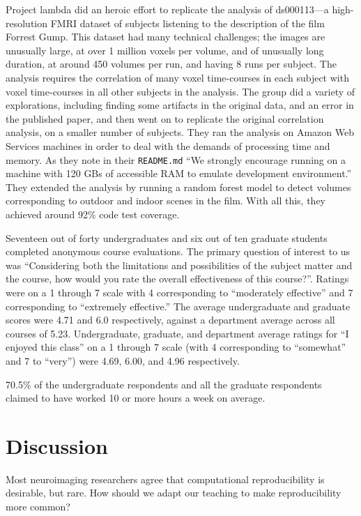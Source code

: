 Project lambda did an heroic effort to replicate the analysis of ds000113---a
high-resolution FMRI dataset of subjects listening to the description of the
film Forrest Gump.  This dataset had many technical challenges; the images are
unusually large, at over 1 million voxels per volume, and of unusually long
duration, at around 450 volumes per run, and having 8 runs per subject.  The
analysis requires the correlation of many voxel time-courses in each subject
with voxel time-courses in all other subjects in the analysis.  The group did
a variety of explorations, including finding some artifacts in the original
data, and an error in the published paper, and then went on to replicate the
original correlation analysis, on a smaller number of subjects.  They ran the
analysis on Amazon Web Services machines in order to deal with the demands of
processing time and memory.  As they note in their \texttt{README.md} ``We
strongly encourage running on a machine with 120 GBs of accessible RAM to
emulate development environment.'' They extended the analysis by running a
random forest model to detect volumes corresponding to outdoor and indoor
scenes in the film.  With all this, they achieved around 92\% code test
coverage.

Seventeen out of forty undergraduates and six out of ten graduate students
completed anonymous course evaluations.  The primary question of interest to
us was ``Considering both the limitations and possibilities of the subject
matter and the course, how would you rate the overall effectiveness of this
course?''.  Ratings were on a 1 through 7 scale with 4 corresponding to
``moderately effective'' and 7 corresponding to ``extremely effective.''
The average undergraduate and graduate scores were
4.71 and 6.0 respectively, against a department average across all courses of
5.23.  Undergraduate, graduate, and department average ratings for ``I enjoyed
this class'' on a 1 through 7 scale (with 4 corresponding to
``somewhat'' and 7 to ``very'')
were 4.69, 6.00, and 4.96 respectively.

70.5\% of the undergraduate respondents and all the graduate respondents
claimed to have worked 10 or more hours a week on average.

\section{Discussion}\label{discussion}

Most neuroimaging researchers agree that computational reproducibility is
desirable, but rare.  How should we adapt our teaching to make reproducibility
more common?

